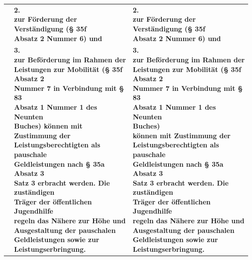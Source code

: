 \documentclass[10pt,a4paper,landscape]{article}
\begin{document}
\begin{longtable}{|L{8.2cm}|L{8.2cm}|L{8.2cm}|}
\hhline{|---|}
 & \textbf{2.   \newline zur Förderung der Verständigung (\S{} 35f  \newline Absatz 2 Nummer 6) und } & \textbf{2.   \newline zur Förderung der Verständigung (\S{} 35f  \newline Absatz 2 Nummer 6) und } \\
\hhline{|---|}
 & \textbf{3.   \newline zur Beförderung im Rahmen der  \newline Leistungen zur Mobilität (\S{} 35f Absatz 2  \newline Nummer 7 in Verbindung mit \S{} 83  \newline Absatz 1 Nummer 1 des Neunten  \newline Buches) können mit Zustimmung der  \newline Leistungsberechtigten als pauschale  \newline Geldleistungen nach \S{} 35a Absatz 3  \newline Satz 3 erbracht werden. Die zuständigen  \newline Träger der öffentlichen Jugendhilfe  \newline regeln das Nähere zur Höhe und  \newline Ausgestaltung der pauschalen  \newline Geldleistungen sowie zur  \newline Leistungserbringung. } & \textbf{3.   \newline zur Beförderung im Rahmen der  \newline Leistungen zur Mobilität (\S{} 35f Absatz 2  \newline Nummer 7 in Verbindung mit \S{} 83  \newline Absatz 1 Nummer 1 des Neunten  \newline Buches)   \newline können mit Zustimmung der  \newline Leistungsberechtigten als pauschale  \newline Geldleistungen nach \S{} 35a Absatz 3  \newline Satz 3 erbracht werden. Die zuständigen  \newline Träger der öffentlichen Jugendhilfe  \newline regeln das Nähere zur Höhe und  \newline Ausgestaltung der pauschalen  \newline Geldleistungen sowie zur  \newline Leistungserbringung. } \\

\end{longtable}
\end{document}

